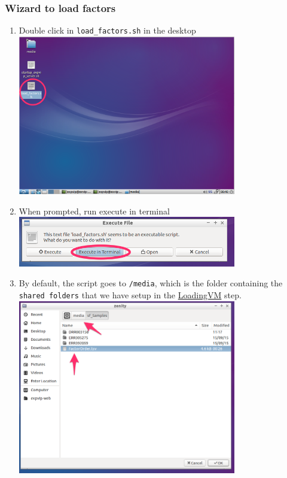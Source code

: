 \subsubsection{Wizard to load factors}\label{wizard-to-load-factors}

\begin{enumerate}
\def\labelenumi{\arabic{enumi}.}
\itemsep1pt\parskip0pt
\item
  Double click in \lstinline!load_factors.sh! in the desktop
  \\ \includegraphics[width=0.75\textwidth]{expVIP/tutorial/images/LoadFactors01.png}
\item
  When prompted, run execute in terminal
  \\ \includegraphics[width=0.75\textwidth]{expVIP/tutorial/images/LoadFactors02.png}
\item
  By default, the script goes to \lstinline!/media!, which is the folder
  containing the \lstinline!shared folders! that we have setup in the
  \url{LoadingVM} step. \\ \includegraphics[width=0.75\textwidth]{expVIP/tutorial/images/LoadFactors03.png}

\end{enumerate}
